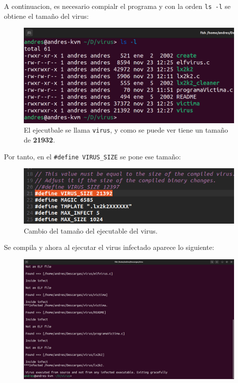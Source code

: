 \documentclass{article}
\begin{document}
A continuacion, es necesario compialr el programa y con la orden \verb|ls -l| se obtiene el tamaño del virus:

\begin{figure}[H]
    \includegraphics[width=\textwidth]{imagenes/Captura desde 2022-11-23 12-28-06.png}
    \caption{El ejecutbale se llama \texttt{virus}, y como se puede ver tiene un tamaño de \textbf{21932}.}
\end{figure}


Por tanto, en el \verb|#define VIRUS_SIZE| se pone ese tamaño:

\begin{figure}[H]
    \includegraphics[width=\textwidth]{imagenes/Captura desde 2022-11-23 12-29-27.png}
    \caption{Cambio del tamaño del ejecutable del virus.}
\end{figure}

Se compila y ahora al ejecutar el virus infectado aparece lo siguiente:

\begin{figure}[H]
    \includegraphics[width=\textwidth]{imagenes/Captura desde 2022-11-23 12-32-53.png}
\end{figure}
\end{document}
